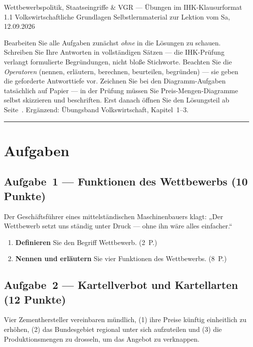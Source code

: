 \documentclass[11pt, a4paper]{article}
\begin{document}
%
  {Wettbewerbspolitik, Staatseingriffe \& VGR --- Übungen im IHK-Klausurformat}%
  {1.1 Volkswirtschaftliche Grundlagen}%
  {Selbstlernmaterial zur Lektion vom Sa, 12.09.2026}


\begin{merksatz}[title={\bfseries So nutzen Sie dieses Aufgabenheft}]
Bearbeiten Sie alle Aufgaben zunächst \emph{ohne} in die Lösungen zu schauen. Schreiben
Sie Ihre Antworten in vollständigen Sätzen --- die IHK-Prüfung verlangt formulierte
Begründungen, nicht bloße Stichworte. Beachten Sie die \emph{Operatoren} (nennen,
erläutern, berechnen, beurteilen, begründen) --- sie geben die geforderte
Antworttiefe vor. Zeichnen Sie bei den Diagramm-Aufgaben tatsächlich auf Papier ---
in der Prüfung müssen Sie Preis-Mengen-Diagramme selbst skizzieren und beschriften. Erst
danach öffnen Sie den Lösungsteil ab Seite~\pageref{loesungen}. Ergänzend: Übungsband
Volkswirtschaft, Kapitel~1--3.
\end{merksatz}

\tableofcontents
\vspace{1em}
\hrule

\section{Aufgaben}

\subsection*{Aufgabe~1 --- Funktionen des Wettbewerbs (10 Punkte)}

Der Geschäftsführer eines mittelständischen Maschinenbauers klagt: „Der Wettbewerb setzt
uns ständig unter Druck --- ohne ihn wäre alles einfacher.``

\begin{enumerate}[label=(\alph*)]
  \item \textbf{Definieren} Sie den Begriff Wettbewerb. \hfill (2~P.)
  \item \textbf{Nennen und erläutern} Sie vier Funktionen des Wettbewerbs. \hfill (8~P.)
\end{enumerate}

\subsection*{Aufgabe~2 --- Kartellverbot und Kartellarten (12 Punkte)}

Vier Zementhersteller vereinbaren mündlich, (1) ihre Preise künftig einheitlich zu
erhöhen, (2) das Bundesgebiet regional unter sich aufzuteilen und (3) die
Produktionsmengen zu drosseln, um das Angebot zu verknappen.
\end{document}
